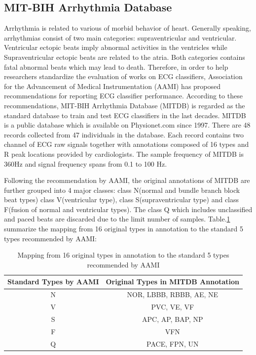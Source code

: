 \subsection{MIT-BIH Arrhythmia Database}

Arrhythmia is related to various of morbid behavior of heart. Generally speaking, arrhythmias consist of two main categories: supraventricular and ventricular. Ventricular ectopic beats imply abnormal activities in the ventricles while Supraventricular ectopic beats are related to the atria. Both categories contains fatal abnormal beats which may lead to death. Therefore, in order to help researchers standardize the evaluation of works on ECG classifiers, Association for the Advancement of Medical Instrumentation (AAMI) \cite{aami} has proposed recommendations for reporting ECG classifier performance. 
According to these recommendations, MIT-BIH Arrhythmia Database (MITDB) is regarded as the standard database to train and test ECG classifiers in the last decades. MITDB is a public database which is available on Physionet.com \cite{physionet} since 1997\cite{mitdb}. There are 48 records collected from 47 individuals in the database. Each record contains two channel of ECG raw signals together with annotations composed of 16 types and R peak locations provided by cardiologists. The sample frequency of MITDB is 360Hz and signal frequency spans from 0.1 to 100 Hz. 

Following the recommendation by AAMI, the original annotations of MITDB are further grouped into 4 major classes: class N(normal and bundle branch block beat types) class V(ventricular type), class S(supraventricular type) and class F(fusion of normal and ventricular types). The class Q which includes unclassified and paced beats are discarded due to the limit number of samples. Table.\ref{table:grouping_types} summarize the mapping from 16 original types in annotation to the standard 5 types recommended by AAMI:

\begin{table}[h]
\centering
\caption{Mapping from 16 original types in annotation to the standard 5 types recommended by AAMI}
\label{table:grouping_types}
\begin{tabular}{|c|c|}
\hline
Standard Types by AAMI & Original Types in MITDB Annotation \\ \hline
N                      & NOR, LBBB, RBBB, AE, NE            \\ \hline
V                      & PVC, VE, VF                        \\ \hline
S                      & APC, AP, BAP, NP                   \\ \hline
F                      & VFN                                \\ \hline
Q                      & PACE, FPN, UN                      \\ \hline
\end{tabular}
\end{table}




